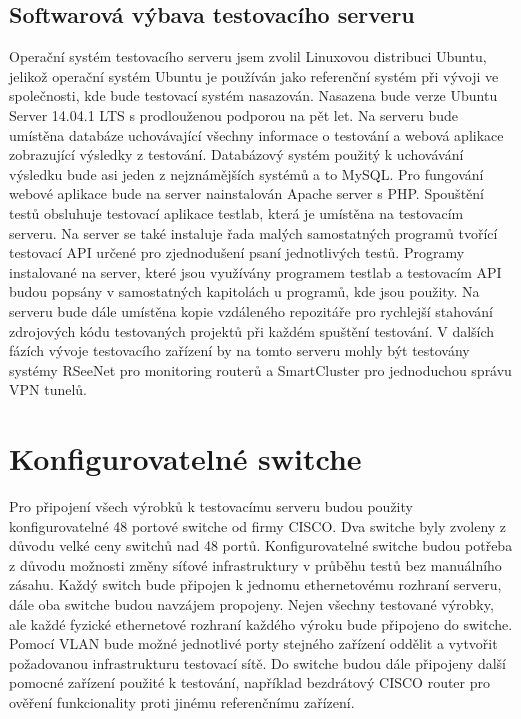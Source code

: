\subsection{Softwarová výbava testovacího serveru}
Operační systém testovacího serveru jsem zvolil Linuxovou distribuci Ubuntu, jelikož operační systém Ubuntu je používán jako referenční systém při vývoji ve společnosti, kde bude testovací systém nasazován. Nasazena bude verze Ubuntu Server 14.04.1 LTS s prodlouženou podporou na pět let. Na serveru bude umístěna databáze uchovávající všechny informace o testování a webová aplikace zobrazující výsledky z testování. Databázový systém použitý k uchovávání výsledku bude asi jeden z nejznámějších systémů a to MySQL. Pro fungování webové aplikace bude na server nainstalován Apache server s PHP. Spouštění testů obsluhuje testovací aplikace testlab, která je umístěna na testovacím serveru. Na server se také instaluje řada malých samostatných programů tvořící testovací API určené pro zjednodušení psaní jednotlivých testů. Programy instalované na server, které jsou využívány programem testlab a testovacím API budou popsány v samostatných kapitolách u programů, kde jsou použity. Na serveru bude dále umístěna kopie vzdáleného repozitáře pro rychlejší stahování zdrojových kódu testovaných projektů při každém spuštění testování. V dalších fázích vývoje testovacího zařízení by na tomto serveru mohly být testovány systémy RSeeNet pro monitoring routerů a SmartCluster pro jednoduchou správu VPN tunelů.

\section{Konfigurovatelné switche}
Pro připojení všech výrobků k testovacímu serveru budou použity konfigurovatelné 48 portové switche od firmy CISCO. Dva switche byly zvoleny z důvodu velké ceny switchů nad 48 portů. Konfigurovatelné switche budou potřeba z důvodu možnosti změny síťové infrastruktury v průběhu testů bez manuálního zásahu. Každý switch bude připojen k jednomu ethernetovému rozhraní serveru, dále oba switche budou navzájem propojeny. Nejen všechny testované výrobky, ale každé fyzické ethernetové rozhraní každého výroku bude připojeno do switche. Pomocí VLAN bude možné jednotlivé porty stejného zařízení oddělit a vytvořit požadovanou infrastrukturu testovací sítě. Do switche budou dále připojeny další pomocné zařízení použité k testování, například bezdrátový CISCO router pro ověření funkcionality proti jinému referenčnímu zařízení.

